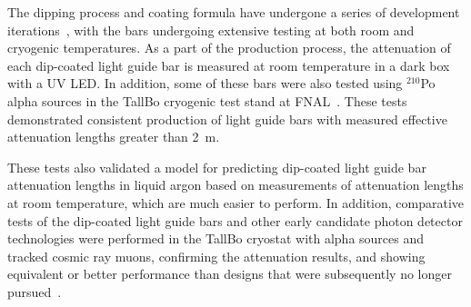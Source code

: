 The dipping process and coating formula have undergone a series of development iterations~\cite{Moss:2014ota},
with the bars undergoing extensive testing at both room and cryogenic temperatures.  
As a part of the production process, the attenuation of each dip-coated light guide bar is measured at room temperature in a dark box with a UV LED.  In addition, some of these bars were also tested using $^{210}$Po alpha sources in the TallBo cryogenic test stand at FNAL~\cite{Moss:2016yhb}. These tests demonstrated consistent production of light guide bars with measured effective attenuation lengths greater than \SI{2}{m}. 

These tests also validated a model for predicting dip-coated light guide bar attenuation lengths in liquid argon based on measurements of attenuation lengths at room temperature, which are much easier to perform.  In addition, comparative tests of the dip-coated light guide bars and other early candidate photon detector technologies were performed in the TallBo cryostat with alpha sources and tracked cosmic ray muons, confirming the  attenuation results, and showing equivalent or better performance than designs that were subsequently no longer pursued~\cite{Whittington:2015rkr}.




